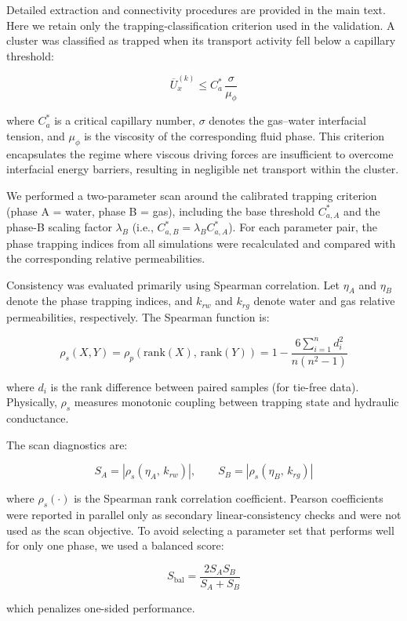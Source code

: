 \documentclass[draft,wrr]{agutexSI2019}
\begin{document}
\begin{article}
Detailed extraction and connectivity procedures are provided in the main text.
Here we retain only the trapping-classification criterion used in the validation.
A cluster was classified as trapped when its transport activity fell below a
capillary threshold:
\begin{linenomath*}
\begin{equation}
\label{eq:locking_criterion}
\overline{U}_x^{(k)}
\le
C_a^{*}\,
\frac{\sigma}{\mu_{\phi}}
\end{equation}
\end{linenomath*}
where $C_a^{*}$ is a critical capillary number, $\sigma$ denotes the gas--water
interfacial tension, and $\mu_{\phi}$ is the viscosity of the corresponding fluid
phase. This criterion encapsulates the regime where viscous driving forces are
insufficient to overcome interfacial energy barriers, resulting in negligible net
transport within the cluster.

We performed a two-parameter scan around the calibrated trapping criterion
(phase A = water, phase B = gas),
including the base threshold $C_{a,A}^{*}$ and the phase-B scaling factor
$\lambda_B$ (i.e., $C_{a,B}^{*}=\lambda_B C_{a,A}^{*}$). For each parameter pair,
the phase trapping indices from all simulations were recalculated and compared
with the corresponding relative permeabilities.

Consistency was evaluated primarily using Spearman correlation. Let $\eta_A$
and $\eta_B$ denote the phase trapping indices, and
$k_{rw}$ and $k_{rg}$ denote water and gas relative permeabilities, respectively.
The Spearman function is:
\begin{linenomath*}
\begin{equation}
\label{eq:spearman_def}
\rho_s(X,Y)
=
\rho_p\!\left(\mathrm{rank}(X),\,\mathrm{rank}(Y)\right)
=
1-\frac{6\sum_{i=1}^{n} d_i^2}{n\left(n^2-1\right)}
\end{equation}
\end{linenomath*}
where $d_i$ is the rank difference between paired samples (for tie-free data).
Physically, $\rho_s$ measures monotonic coupling between trapping state and
hydraulic conductance.

The scan diagnostics are:
\begin{linenomath*}
\begin{equation}
\label{eq:scan_corr_A}
S_A = \left|\rho_s\!\left(\eta_A,\,k_{rw}\right)\right|,
\qquad
S_B = \left|\rho_s\!\left(\eta_B,\,k_{rg}\right)\right|
\end{equation}
\end{linenomath*}
where $\rho_s(\cdot)$ is the Spearman rank correlation coefficient. Pearson
coefficients were reported in parallel only as secondary linear-consistency
checks and were not used as the scan objective.
To avoid selecting a parameter set that performs well for only one phase,
we used a balanced score:
\begin{linenomath*}
\begin{equation}
\label{eq:scan_hmean_score}
S_{\mathrm{bal}}
=
\frac{2S_A S_B}{S_A+S_B}
\end{equation}
\end{linenomath*}
which penalizes one-sided performance.


\end{article}
\end{document}
